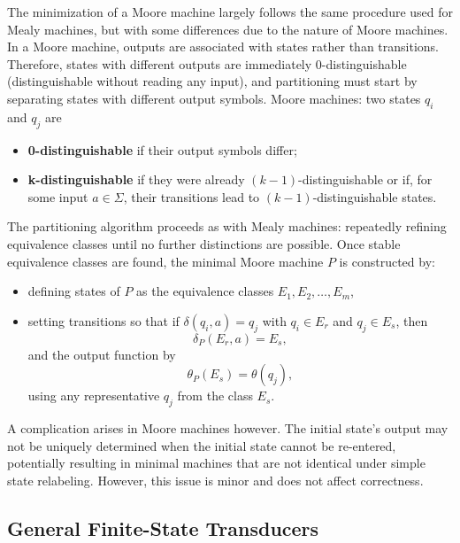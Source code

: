The minimization of a Moore machine largely follows the same procedure used for Mealy machines, 
but with some differences due to the nature of Moore machines. In a Moore machine, outputs are associated with states rather than transitions. 
Therefore, states with different outputs are immediately 0-distinguishable (distinguishable without reading any input), 
and partitioning must start by separating states with different output symbols.\cite{linz2011formal}
Moore machines: two states \(q_i\) and \(q_j\) are
\begin{itemize}
    \item \textbf{0-distinguishable} if their output symbols differ;
    \item \textbf{k-distinguishable} if they were already \((k-1)\)-distinguishable or if, for some input \(a \in \Sigma\), 
    their transitions lead to \((k-1)\)-distinguishable states.
\end{itemize}
The partitioning algorithm proceeds as with Mealy machines: repeatedly refining equivalence classes until no further distinctions are possible.
Once stable equivalence classes are found, the minimal Moore machine \(P\) is constructed by:
    \begin{itemize}
        \item defining states of \(P\) as the equivalence classes \(E_1, E_2, \ldots, E_m\),
        \item setting transitions so that if \(\delta(q_i, a) = q_j\) with \(q_i \in E_r\) and \(q_j \in E_s\), then
        \[
        \delta_P(E_r, a) = E_s,
        \]
        and the output function by
        \[
        \theta_P(E_s) = \theta(q_j),
        \]
        using any representative \(q_j\) from the class \(E_s\).
    \end{itemize}
A complication arises in Moore machines however. The initial state's output may not be uniquely 
determined when the initial state cannot be re-entered, potentially resulting in minimal machines that are not
identical under simple state relabeling. However, this issue is minor and does not affect correctness.

\subsection{General Finite-State Transducers}

